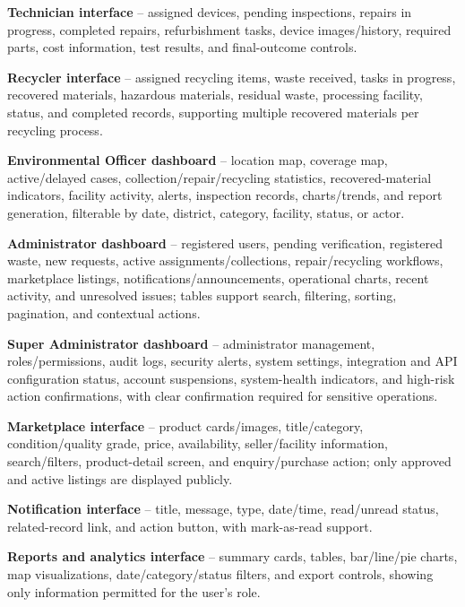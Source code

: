 \textbf{Technician interface} -- assigned devices, pending inspections,
repairs in progress, completed repairs, refurbishment tasks, device
images/history, required parts, cost information, test results, and
final-outcome controls.

\textbf{Recycler interface} -- assigned recycling items, waste received,
tasks in progress, recovered materials, hazardous materials, residual waste,
processing facility, status, and completed records, supporting multiple
recovered materials per recycling process.

\textbf{Environmental Officer dashboard} -- location map, coverage map,
active/delayed cases, collection/repair/recycling statistics, recovered-material
indicators, facility activity, alerts, inspection records, charts/trends, and
report generation, filterable by date, district, category, facility, status, or
actor.

\textbf{Administrator dashboard} -- registered users, pending verification,
registered waste, new requests, active assignments/collections, repair/recycling
workflows, marketplace listings, notifications/announcements, operational
charts, recent activity, and unresolved issues; tables support search, filtering,
sorting, pagination, and contextual actions.

\textbf{Super Administrator dashboard} -- administrator management,
roles/permissions, audit logs, security alerts, system settings, integration and
API configuration status, account suspensions, system-health indicators, and
high-risk action confirmations, with clear confirmation required for sensitive
operations.

\textbf{Marketplace interface} -- product cards/images, title/category,
condition/quality grade, price, availability, seller/facility information,
search/filters, product-detail screen, and enquiry/purchase action; only
approved and active listings are displayed publicly.

\textbf{Notification interface} -- title, message, type, date/time, read/unread
status, related-record link, and action button, with mark-as-read support.

\textbf{Reports and analytics interface} -- summary cards, tables, bar/line/pie
charts, map visualizations, date/category/status filters, and export controls,
showing only information permitted for the user's role.

